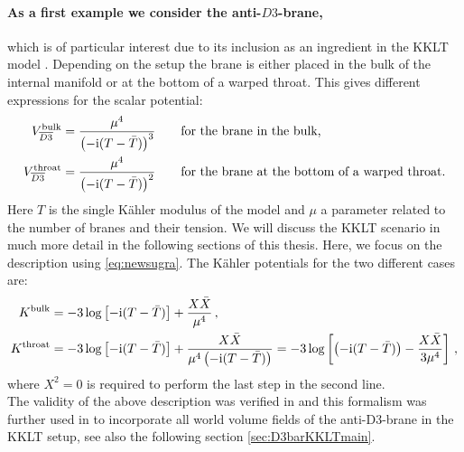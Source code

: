 \documentclass[12pt]{report}
\newcommand{\bea}{\begin{equation}\begin{aligned}}
\newcommand{\eea}{\end{aligned}\end{equation}}
\def\rmi{{\rm i}}
\begin{document}
\paragraph{As a first example we consider the anti-$D3$-brane,} which is of particular interest due to its inclusion as an ingredient in the KKLT model \cite{Kachru:2003aw,Kachru:2003sx}. Depending on the setup the brane is either placed in the bulk of the internal manifold or at the bottom of a warped throat. This gives different expressions for the scalar potential:
\bea 
V^{\text{bulk}}_{\overline{D3}} &= \frac{\mu^4}{\left(-\rmi(T-\bar{T})\right)^3}\qquad \text{for the brane in the bulk,}\\
V^{\text{throat}}_{\overline{D3}} &= \frac{\mu^4}{\left(-\rmi(T-\bar{T})\right)^2}\qquad \text{for the brane at the bottom of a warped throat.}
\eea
Here $T$ is the single Kähler modulus of the model and $\mu$ a parameter related to the number of branes and their tension. We will discuss the KKLT scenario in much more detail in the following sections of this thesis. Here, we focus on the description using \eqref{eq:newsugra}. The Kähler potentials for the two different cases are:
\bea 
K^{\text{bulk}} &= -3 \log \left[ -\rmi(T-\bar{T})\right] + \frac{X \bar{X}}{\mu^4}\,,\\
K^{\text{throat}} &= -3 \log \left[-\rmi (T-\bar{T})\right] + \frac{X\bar{X}}{\mu^4\left(-\rmi (T-\bar{T})\right)} = - 3 \log \left[ \left(-\rmi (T-\bar{T})\right) - \frac{X\bar{X}}{3\mu^4} \right]\,,
\eea
where $X^2=0$ is required to perform the last step in the second line.\\
The validity of the above description was verified in \cite{Kallosh:2014wsa,Bergshoeff:2015jxa} and this formalism was further used in \cite{GarciadelMoral:2017vnz,Cribiori:2019hod} to incorporate all world volume fields of the anti-D3-brane in the KKLT setup, see also the following section \ref{sec:D3barKKLTmain}.
\end{document}
